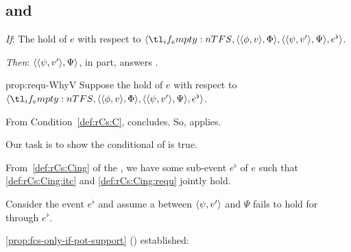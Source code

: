 \subsection{ and \qWhyV{}}

\begin{note}
  \begin{proposition}
    \label{prop:requ-WhyV}

    \begin{itenum}
    \item[\emph{If}:]
      The  hold of \(e\) with respect to \(\langle \vAgent{}, \pvp{\phi}{v}{\Phi}, \pvp{\psi}{v'}{\Psi}, e^{\flat} \rangle\).
    \item[\emph{Then}:]
      \(\langle \langle \psi, v' \rangle, \Psi \rangle\), in part, answers \qWhyV{}.
    \end{itenum}
    \vspace{-\baselineskip}
  \end{proposition}

  \begin{argument}{prop:requ-WhyV}
    Suppose the  hold of \(e\) with respect to \(\langle \vAgent{}, \pvp{\phi}{v}{\Phi}, \pvp{\psi}{v'}{\Psi}, e^{\flat} \rangle\).

    From Condition~\ref{def:rCs:C}, concludes.
    So, \qWhyV{} applies.

    Our task is to show the conditional of \qWhyV{} is true.

    From~\ref{def:rCs:Cing} of the \rCon{}, we have some sub-event \(e^{\flat}\) of \(e\) such that \ref{def:rCs:Cing:itc} and \ref{def:rCs:Cing:requ} jointly hold.

    Consider the event \(e^{\flat}\) and assume a \ros{} between \(\langle \psi, v' \rangle\) and \(\Psi\) fails to hold for \vAgent{} through \(e^{\flat}\).

    \autoref{prop:fcs-only-if-pot-support} () established:


\end{argument}
\end{note}
